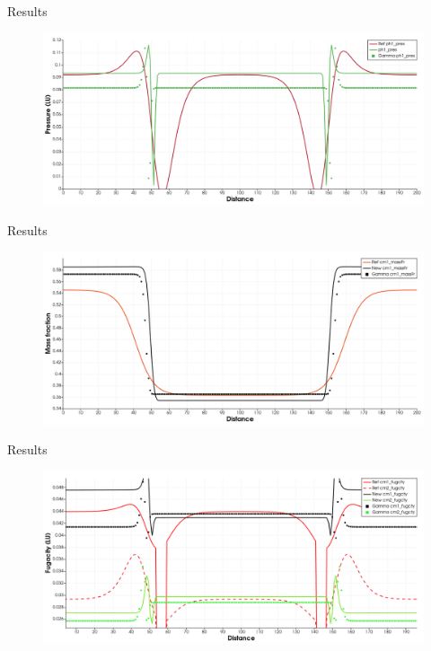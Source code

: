 \documentclass[8pt]{beamer}
\begin{document}
	\begin{frame}{Results}
		\begin{figure}
			\centering
			\includegraphics[width=\textwidth]{pics/1dnewForce/pressure.png}
		\end{figure}
	\end{frame}

	\begin{frame}{Results}
		\begin{figure}
			\centering
			\includegraphics[width=\textwidth]{pics/1dnewForce/massFraction.png}
		\end{figure}
	\end{frame}

	\begin{frame}{Results}
		\begin{figure}
			\centering
			\includegraphics[width=\textwidth]{pics/1dnewForce/fugacity.png}
		\end{figure}
	\end{frame}
\end{document}
